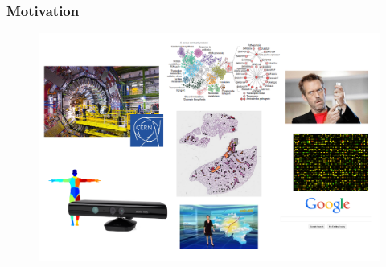 \documentclass{beamer}
\begin{document}
\begin{frame}
    \frametitle{Motivation}
    \begin{figure}
    \vspace{-0.5cm}
    \includegraphics[scale=0.4]{./figures/motivation.png}
    \end{figure}
\end{frame}
\end{document}

